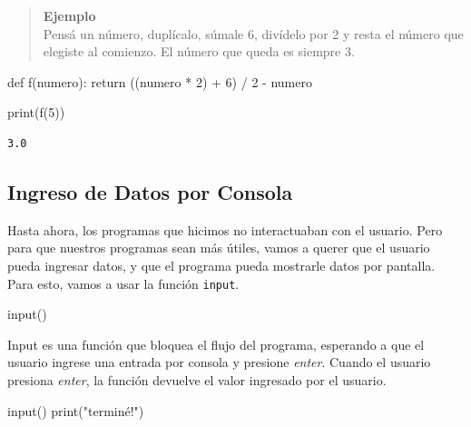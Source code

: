 \documentclass[
  letterpaper,
  DIV=11,
  numbers=noendperiod]{scrreprt}
\newenvironment{Shaded}{\begin{snugshade}}{\end{snugshade}}
\newcommand{\BuiltInTok}[1]{\textcolor[rgb]{0.00,0.23,0.31}{#1}}
\newcommand{\ControlFlowTok}[1]{\textcolor[rgb]{0.00,0.23,0.31}{#1}}
\newcommand{\DecValTok}[1]{\textcolor[rgb]{0.68,0.00,0.00}{#1}}
\newcommand{\KeywordTok}[1]{\textcolor[rgb]{0.00,0.23,0.31}{#1}}
\newcommand{\NormalTok}[1]{\textcolor[rgb]{0.00,0.23,0.31}{#1}}
\newcommand{\OperatorTok}[1]{\textcolor[rgb]{0.37,0.37,0.37}{#1}}
\newcommand{\StringTok}[1]{\textcolor[rgb]{0.13,0.47,0.30}{#1}}
\begin{document}
\begin{quote}
\textbf{Ejemplo}\\
Pensá un número, duplícalo, súmale 6, divídelo por 2 y resta el número
que elegiste al comienzo. El número que queda es siempre 3.
\end{quote}

\begin{Shaded}
\begin{Highlighting}[]
\KeywordTok{def}\NormalTok{ f(numero):}
  \ControlFlowTok{return}\NormalTok{ ((numero }\OperatorTok{*} \DecValTok{2}\NormalTok{) }\OperatorTok{+} \DecValTok{6}\NormalTok{) }\OperatorTok{/} \DecValTok{2} \OperatorTok{{-}}\NormalTok{ numero}
\end{Highlighting}
\end{Shaded}

\begin{Shaded}
\begin{Highlighting}[]
\BuiltInTok{print}\NormalTok{(f(}\DecValTok{5}\NormalTok{))}
\end{Highlighting}
\end{Shaded}

\begin{verbatim}
3.0
\end{verbatim}

\subsection{Ingreso de Datos por
Consola}\label{ingreso-de-datos-por-consola}

Hasta ahora, los programas que hicimos no interactuaban con el usuario.
Pero para que nuestros programas sean más útiles, vamos a querer que el
usuario pueda ingresar datos, y que el programa pueda mostrarle datos
por pantalla. Para esto, vamos a usar la función \texttt{input}.

\begin{Shaded}
\begin{Highlighting}[]
\BuiltInTok{input}\NormalTok{()}
\end{Highlighting}
\end{Shaded}

Input es una función que bloquea el flujo del programa, esperando a que
el usuario ingrese una entrada por consola y presione \emph{enter}.
Cuando el usuario presiona \emph{enter}, la función devuelve el valor
ingresado por el usuario.\\

\begin{Shaded}
\begin{Highlighting}[]
\BuiltInTok{input}\NormalTok{()}
\BuiltInTok{print}\NormalTok{(}\StringTok{"terminé!"}\NormalTok{)}
\end{Highlighting}
\end{Shaded}
\end{document}
